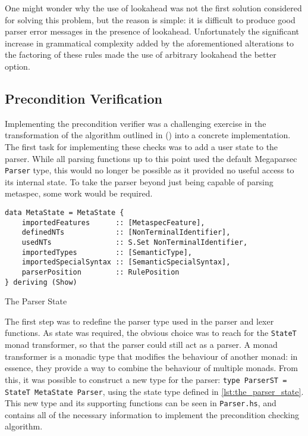 One might wonder why the use of lookahead was not the first solution considered for solving this problem, but the reason is simple: it is difficult to produce good parser error messages in the presence of lookahead.
Unfortunately the significant increase in grammatical complexity added by the aforementioned alterations to the factoring of these rules made the use of arbitrary lookahead the better option. 



\subsection{Precondition Verification} %
\label{sub:precondition_verification}
Implementing the precondition verifier was a challenging exercise in the transformation of the algorithm outlined in  () into a concrete implementation.
The first task for implementing these checks was to add a user state to the parser.
While all parsing functions up to this point used the default Megaparsec \texttt{Parser} type, this would no longer be possible as it provided no useful access to its internal state. 
To take the parser beyond just being capable of parsing \gls{metaspec}, some work would be required. 

\begin{listing}[!htb]
\begin{verbatim}
data MetaState = MetaState {
    importedFeatures      :: [MetaspecFeature],
    definedNTs            :: [NonTerminalIdentifier],
    usedNTs               :: S.Set NonTerminalIdentifier,
    importedTypes         :: [SemanticType],
    importedSpecialSyntax :: [SemanticSpecialSyntax],
    parserPosition        :: RulePosition
} deriving (Show)
\end{verbatim}
\caption{The Parser State}
\label{lst:the_parser_state}
\end{listing}

The first step was to redefine the parser type used in the parser and lexer functions. 
As state was required, the obvious choice was to reach for the \texttt{StateT} monad transformer, so that the parser could still act as a parser. 
A monad transformer is a monadic type that modifies the behaviour of another monad: in essence, they provide a way to combine the behaviour of multiple monads. 
From this, it was possible to construct a new type for the parser: \texttt{type ParserST = StateT MetaState Parser}, using the state type defined in \autoref{lst:the_parser_state}.
This new type and its supporting functions can be seen in \texttt{Parser.hs}, and contains all of the necessary information to implement the precondition checking algorithm.

